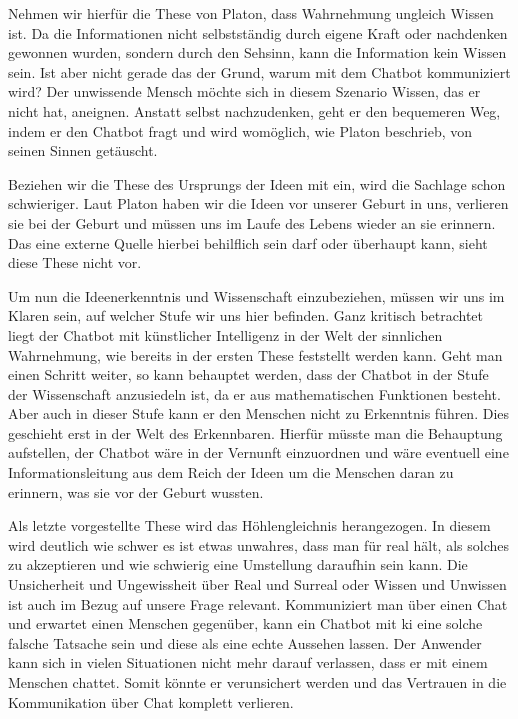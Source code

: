 Nehmen wir hierfür die These von Platon, dass Wahrnehmung ungleich Wissen ist. Da die Informationen nicht selbstständig durch eigene Kraft oder  nachdenken gewonnen wurden, sondern durch den Sehsinn, kann die Information kein Wissen sein. Ist aber nicht gerade das der Grund, warum mit dem Chatbot kommuniziert wird? Der unwissende Mensch möchte sich in diesem Szenario Wissen, das er nicht hat, aneignen. Anstatt selbst nachzudenken, geht er den bequemeren Weg, indem er den Chatbot fragt und wird womöglich, wie Platon beschrieb, von seinen Sinnen getäuscht.

Beziehen wir die These des Ursprungs der Ideen mit ein, wird die Sachlage schon schwieriger. Laut Platon haben wir die Ideen vor unserer Geburt in uns, verlieren sie bei der Geburt und müssen uns im  Laufe des Lebens wieder an sie erinnern. Das eine externe Quelle hierbei behilflich sein darf oder überhaupt kann, sieht diese These nicht vor.

Um nun die Ideenerkenntnis und Wissenschaft einzubeziehen, müssen wir uns im Klaren sein, auf welcher Stufe wir uns hier befinden. Ganz kritisch betrachtet liegt der Chatbot mit künstlicher Intelligenz in der Welt der sinnlichen Wahrnehmung, wie bereits in der ersten These feststellt werden kann. Geht man einen Schritt weiter, so kann behauptet werden, dass der Chatbot in der Stufe der Wissenschaft anzusiedeln ist, da er aus mathematischen Funktionen besteht. Aber auch in dieser Stufe kann er den Menschen nicht zu Erkenntnis führen. Dies geschieht erst in der Welt des Erkennbaren. Hierfür müsste man die Behauptung aufstellen, der Chatbot wäre in der Vernunft einzuordnen und wäre eventuell eine Informationsleitung aus dem Reich der Ideen um die Menschen daran zu erinnern, was sie vor der Geburt wussten.

Als letzte vorgestellte These wird das Höhlengleichnis herangezogen. In diesem wird deutlich wie schwer es ist etwas unwahres, dass man für real hält, als solches zu akzeptieren und wie schwierig eine Umstellung daraufhin sein kann. Die Unsicherheit und Ungewissheit über Real und Surreal oder Wissen und Unwissen ist auch im Bezug auf unsere Frage relevant. Kommuniziert man über einen Chat und erwartet einen Menschen gegenüber, kann ein Chatbot mit \ac{ki} eine solche falsche Tatsache sein und diese als eine echte Aussehen lassen. Der Anwender kann sich in vielen Situationen nicht mehr darauf verlassen, dass er mit einem Menschen chattet. Somit könnte er verunsichert werden und das Vertrauen in die Kommunikation über Chat komplett verlieren.  


